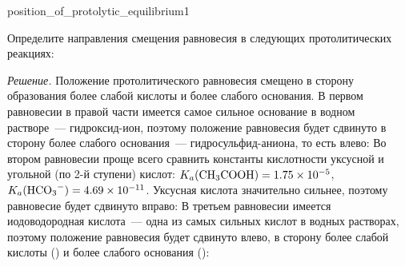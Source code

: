\begin{example}{}{position_of_protolytic_equilibrium1}
    \begin{condition}
        Определите направления смещения равновесия в следующих протолитических реакциях:
    \end{condition}

    \medskip

    \textit{Решение.} Положение протолитического равновесия смещено в сторону образования более слабой кислоты и более слабого основания. В первом равновесии в правой части имеется самое сильное основание в водном растворе~--- гидроксид-ион, поэтому положение равновесия будет сдвинуто в сторону более слабого основания~--- гидросульфид-аниона, то есть влево:
    Во втором равновесии проще всего сравнить константы кислотности уксусной и угольной (по 2-й ступени) кислот: $K_a(\ce{CH3COOH}) = \num{1,75e-5}$, $K_a(\ce{HCO3^-}) = \num{4,69e-11}$. Уксусная кислота значительно сильнее, поэтому равновесие будет сдвинуто вправо:
    В третьем равновесии имеется иодоводородная кислота~--- одна из самых сильных кислот в водных растворах, поэтому положение равновесия будет сдвинуто влево, в сторону более слабой кислоты () и более слабого основания ():

\end{example}

